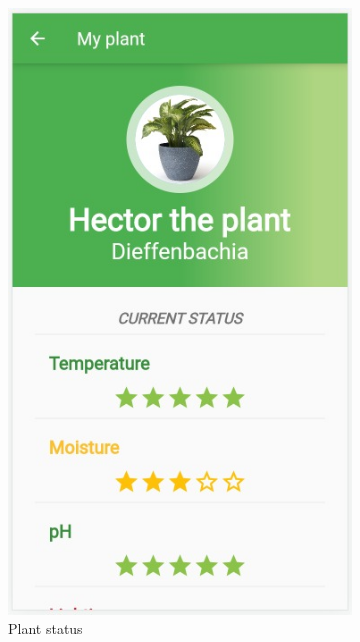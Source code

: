 \begin{figure}[!ht]
    \centering
    \begin{subfigure}[b]{0.3\columnwidth}
        \centering
        \includegraphics[width=\textwidth]{images/profile1.jpeg}
        \caption{Plant status}
    \end{subfigure}
    \begin{subfigure}[b]{0.3\columnwidth}
        \centering

\end{subfigure}
\end{figure}
